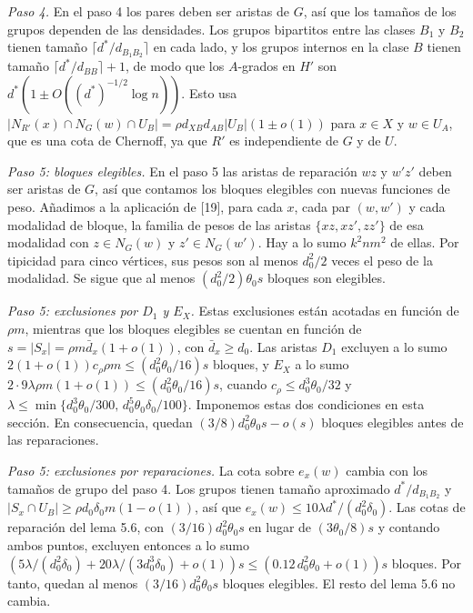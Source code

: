 \documentclass[spanish,11pt,a4paper]{article}
\begin{document}
\emph{Paso 4.} En el paso 4 los pares deben ser aristas de \(G\), así que los tamaños de los grupos dependen de las densidades. Los grupos bipartitos entre las clases \(B_1\) y \(B_2\) tienen tamaño \(\lceil d^*/d_{B_1B_2}\rceil\) en cada lado, y los grupos internos en la clase \(B\) tienen tamaño \(\lceil d^*/d_{BB}\rceil+1\), de modo que los \(A\)-grados en \(H'\) son \(d^*(1\pm O((d^*)^{-1/2}\log n))\). Esto usa \(|N_{R'}(x)\cap N_G(w)\cap U_B|=\rho d_{XB}d_{AB}|U_B|(1\pm o(1))\) para \(x\in X\) y \(w\in U_A\), que es una cota de Chernoff, ya que \(R'\) es independiente de \(G\) y de \(U\).

\emph{Paso 5: bloques elegibles.} En el paso 5 las aristas de reparación \(wz\) y \(w'z'\) deben ser aristas de \(G\), así que contamos los bloques elegibles con nuevas funciones de peso. Añadimos a la aplicación de {[}19{]}, para cada \(x\), cada par \((w,w')\) y cada modalidad de bloque, la familia de pesos de las aristas \(\{xz,xz',zz'\}\) de esa modalidad con \(z\in N_G(w)\) y \(z'\in N_G(w')\). Hay a lo sumo \(k^2nm^2\) de ellas. Por tipicidad para cinco vértices, sus pesos son al menos \(d_0^2/2\) veces el peso de la modalidad. Se sigue que al menos \((d_0^2/2)\theta_0s\) bloques son elegibles.

\emph{Paso 5: exclusiones por \(D_1\) y \(E_X\).} Estas exclusiones están acotadas en función de \(\rho m\), mientras que los bloques elegibles se cuentan en función de \(s=|S_x|=\rho m\bar d_x(1+o(1))\), con \(\bar d_x\ge d_0\). Las aristas \(D_1\) excluyen a lo sumo \(2(1+o(1))c_\rho\rho m\le(d_0^2\theta_0/16)s\) bloques, y \(E_X\) a lo sumo \(2\cdot9\lambda\rho m(1+o(1))\le(d_0^2\theta_0/16)s\), cuando \(c_\rho\le d_0^3\theta_0/32\) y \(\lambda\le\min\{d_0^3\theta_0/300,\,d_0^5\theta_0\delta_0/100\}\). Imponemos estas dos condiciones en esta sección. En consecuencia, quedan \((3/8)d_0^2\theta_0s-o(s)\) bloques elegibles antes de las reparaciones.

\emph{Paso 5: exclusiones por reparaciones.} La cota sobre \(e_x(w)\) cambia con los tamaños de grupo del paso 4. Los grupos tienen tamaño aproximado \(d^*/d_{B_1B_2}\) y \(|S_x\cap U_B|\ge\rho d_0\delta_0m(1-o(1))\), así que \(e_x(w)\le10\lambda d^*/(d_0^2\delta_0)\). Las cotas de reparación del lema 5.6, con \((3/16)d_0^2\theta_0s\) en lugar de \((3\theta_0/8)s\) y contando ambos puntos, excluyen entonces a lo sumo \((5\lambda/(d_0^2\delta_0)+20\lambda/(3d_0^3\delta_0)+o(1))s\le(0.12\,d_0^2\theta_0+o(1))s\) bloques. Por tanto, quedan al menos \((3/16)d_0^2\theta_0s\) bloques elegibles. El resto del lema 5.6 no cambia.
\end{document}
